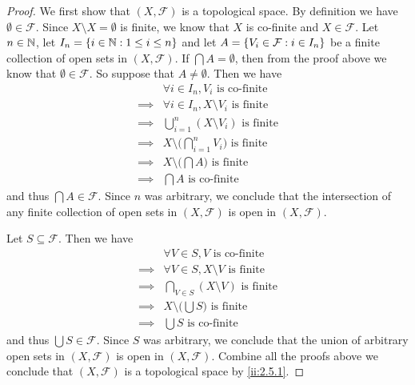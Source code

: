 \begin{proof}
  We first show that \((X, \mathcal{F})\) is a topological space.
  By definition we have \(\emptyset \in \mathcal{F}\).
  Since \(X \setminus X = \emptyset\) is finite, we know that \(X\) is co-finite and \(X \in \mathcal{F}\).
  Let \(n \in \mathbb{N}\), let \(I_n = \left\lbrace i \in \mathbb{N} : 1 \leq i \leq n\right\rbrace\) and let \(A = \left\lbrace V_i \in \mathcal{F} : i \in I_n\right\rbrace\) be a finite collection of open sets in \((X, \mathcal{F})\).
  If \(\bigcap A = \emptyset\), then from the proof above we know that \(\emptyset \in \mathcal{F}\).
  So suppose that \(A \neq \emptyset\).
  Then we have
  \begin{align*}
             & \forall i \in I_n, V_i \text{ is co-finite}                     \\
    \implies & \forall i \in I_n, X \setminus V_i \text{ is finite}            \\
    \implies & \bigcup_{i = 1}^n (X \setminus V_i) \text{ is finite}           \\
    \implies & X \setminus \bigg(\bigcap_{i = 1}^n V_i\bigg) \text{ is finite} \\
    \implies & X \setminus \bigg(\bigcap A\bigg) \text{ is finite}             \\
    \implies & \bigcap A \text{ is co-finite}
  \end{align*}
  and thus \(\bigcap A \in \mathcal{F}\).
  Since \(n\) was arbitrary, we conclude that the intersection of any finite collection of open sets in \((X, \mathcal{F})\) is open in \((X, \mathcal{F})\).

  Let \(S \subseteq \mathcal{F}\).
  Then we have
  \begin{align*}
             & \forall V \in S, V \text{ is co-finite}             \\
    \implies & \forall V \in S, X \setminus V \text{ is finite}    \\
    \implies & \bigcap_{V \in S} (X \setminus V) \text{ is finite} \\
    \implies & X \setminus \bigg(\bigcup S\bigg) \text{ is finite} \\
    \implies & \bigcup S \text{ is co-finite}
  \end{align*}
  and thus \(\bigcup S \in \mathcal{F}\).
  Since \(S\) was arbitrary, we conclude that the union of arbitrary open sets in \((X, \mathcal{F})\) is open in \((X, \mathcal{F})\).
  Combine all the proofs above we conclude that \((X, \mathcal{F})\) is a topological space by \cref{ii:2.5.1}.


\end{proof}
